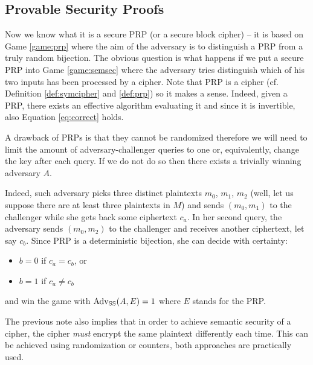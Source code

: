 
\subsection{Provable Security Proofs}

Now we know what it is a secure PRP (or a secure block cipher) -- it is based on Game \ref{game:prp} where the aim of the adversary is to distinguish a PRP from a truly random bijection. The obvious question is what happens if we put a secure PRP into Game \ref{game:semsec} where the adversary tries distinguish which of his two inputs has been processed by a cipher. Note that PRP is a cipher (cf. Definition \ref{def:symcipher} and \ref{def:prp}) so it makes a sense. Indeed, given a PRP, there exists an effective algorithm evaluating it and since it is invertible, also Equation \ref{eq:correct} holds.

\begin{note}
\label{note:singleaccess}
	A drawback of PRPs is that they cannot be randomized therefore we will need to limit the amount of adversary-challenger queries to one or, equivalently, change the key after each query. If we do not do so then there exists a trivially winning adversary $A$.
	
	Indeed, such adversary picks three distinct plaintexts $m_0$, $m_1$, $m_2$ (well, let us suppose there are at least three plaintexts in $M$) and sends $(m_0,m_1)$ to the challenger while she gets back some ciphertext $c_a$. In her second query, the adversary sends $(m_0,m_2)$ to the challenger and receives another ciphertext, let say $c_b$. Since PRP is a deterministic bijection, she can decide with certainty:
	\begin{itemize}
		\item $b=0$ if $c_a = c_b$, or
		\item $b=1$ if $c_a \neq c_b$
	\end{itemize}
	and win the game with $\operatorname*{Adv_{SS}}(A,E) = 1$ where $E$ stands for the PRP.
\end{note}

\begin{note}
\label{note:randomize}
	The previous note also implies that in order to achieve semantic security of a cipher, the cipher {\em must} encrypt the same plaintext differently each time. This can be achieved using randomization or counters, both approaches are practically used.
\end{note}

